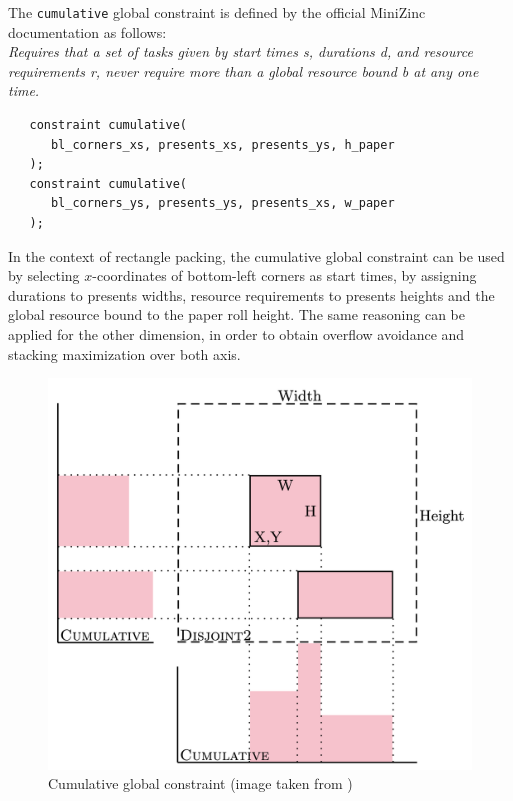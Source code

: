 \documentclass[a4paper,10pt]{article}
\newcounter{subsubsubsection}[subsubsection]
\begin{document}
 \label{sec:cumulative}
The \texttt{cumulative} global constraint is defined by the official MiniZinc documentation \cite{minizinc} as follows: \\
\emph{Requires that a set of tasks given by start times s, durations d, and resource requirements r, never require more than a global resource bound b at any one time.}

\begin{verbatim}
   constraint cumulative(
      bl_corners_xs, presents_xs, presents_ys, h_paper
   );
   constraint cumulative(
      bl_corners_ys, presents_ys, presents_xs, w_paper
   );
\end{verbatim}

In the context of rectangle packing, the cumulative global constraint can be used by selecting $x$-coordinates of bottom-left corners as start times, by assigning durations to presents widths, resource requirements to presents heights and the global resource bound to the paper roll height.
The same reasoning can be applied for the other dimension, in order to obtain overflow avoidance and stacking maximization over both axis.

\begin{figure}[h]
   \centering
   \includegraphics[scale=0.2]{cumulative.png}
   \caption{Cumulative global constraint (image taken from \cite{cumulative})}
   \label{fig:cumulative}
\end{figure}
\end{document}
